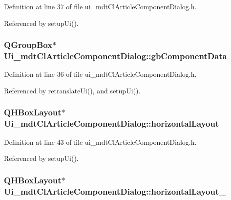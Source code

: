 Definition at line 37 of file ui\-\_\-mdt\-Cl\-Article\-Component\-Dialog.\-h.



Referenced by setup\-Ui().

\hypertarget{class_ui__mdt_cl_article_component_dialog_aa35268caddcc05ebeaf50dc9c0927668}{
\subsubsection[{gb\-Component\-Data}]{\setlength{\rightskip}{0pt plus 5cm}Q\-Group\-Box$\ast$ Ui\-\_\-mdt\-Cl\-Article\-Component\-Dialog\-::gb\-Component\-Data}}\label{class_ui__mdt_cl_article_component_dialog_aa35268caddcc05ebeaf50dc9c0927668}


Definition at line 36 of file ui\-\_\-mdt\-Cl\-Article\-Component\-Dialog.\-h.



Referenced by retranslate\-Ui(), and setup\-Ui().

\hypertarget{class_ui__mdt_cl_article_component_dialog_a95b03ea46cabbb65548ddbc1111e108d}{
\subsubsection[{horizontal\-Layout}]{\setlength{\rightskip}{0pt plus 5cm}Q\-H\-Box\-Layout$\ast$ Ui\-\_\-mdt\-Cl\-Article\-Component\-Dialog\-::horizontal\-Layout}}\label{class_ui__mdt_cl_article_component_dialog_a95b03ea46cabbb65548ddbc1111e108d}


Definition at line 43 of file ui\-\_\-mdt\-Cl\-Article\-Component\-Dialog.\-h.



Referenced by setup\-Ui().

\hypertarget{class_ui__mdt_cl_article_component_dialog_a64640a37e9c0ed888bc23d0dd4268b2f}{
\subsubsection[{horizontal\-Layout\-\_\-2}]{\setlength{\rightskip}{0pt plus 5cm}Q\-H\-Box\-Layout$\ast$ Ui\-\_\-mdt\-Cl\-Article\-Component\-Dialog\-::horizontal\-Layout\-\_}}\label{class_ui__mdt_cl_article_component_dialog_a64640a37e9c0ed888bc23d0dd4268b2f}


